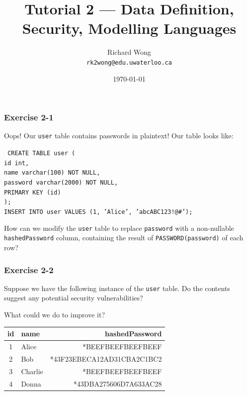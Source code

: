 

\title{Tutorial 2 --- Data Definition, Security, Modelling Languages}

\author{Richard Wong \\ \small \texttt{rk2wong@edu.uwaterloo.ca}}
\date{\today}




\begin{frame}
  \titlepage

\end{frame}


\begin{frame}
\frametitle{Exercise 2-1}

Oops! Our \texttt{user} table contains passwords in plaintext! Our table looks like:

\texttt{
  CREATE TABLE user ( \\
    id int, \\
    name varchar(100) NOT NULL, \\
    password varchar(2000) NOT NULL, \\
    PRIMARY KEY (id) \\
  ); \\
  INSERT INTO user VALUES (1, 'Alice', 'abcABC123!@\#');
}

How can we modify the \texttt{user} table to replace \texttt{password} with a non-nullable \texttt{hashedPassword} column, containing the result of \texttt{PASSWORD(password)} of each row?

\end{frame}


\begin{frame}
\frametitle{Exercise 2-2}

Suppose we have the following instance of the \texttt{user} table. Do the contents suggest any potential security vulnerabilities?

What could we do to improve it?

\begin{center}
  \begin{tabular}{||c l r||}
  \hline
  id & name & hashedPassword \\ [0.5ex]
  \hline\hline
  1 & Alice & *BEEFBEEFBEEFBEEF \\
  \hline
  2 & Bob & *43F23EBECA12AD31CBA2C1BC2 \\
  \hline
  3 & Charlie & *BEEFBEEFBEEFBEEF \\
  \hline
  4 & Donna & *43DBA275606D7A633AC28 \\
  \hline
\end{tabular}
\end{center}

\end{frame}


